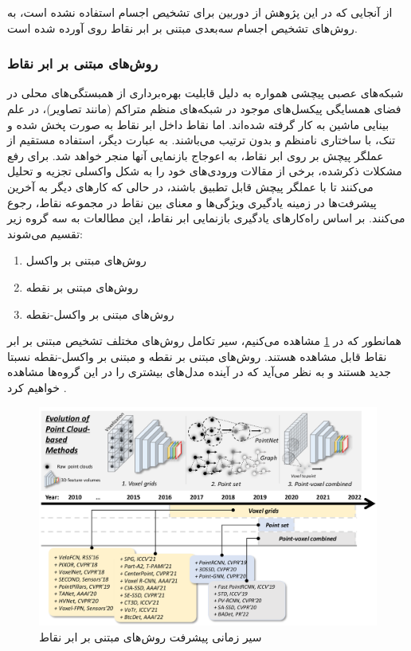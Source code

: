 از آنجایی که در این پژوهش از دوربین برای تشخیص اجسام استفاده نشده است، به روش‌های تشخیص اجسام سه‌بعدی مبتنی بر ابر نقاط روی آورده شده است.

\subsubsection{روش‌های مبتنی بر ابر نقاط}

شبکه‌های عصبی پیچشی همواره به دلیل قابلیت بهره‌برداری از همبستگی‌های  محلی در فضای همسایگی پیکسل‌های موجود در شبکه‌های منظم متراکم (مانند تصاویر)، در علم بینایی ماشین به کار گرفته‌ شده‌اند. اما نقاط داخل ابر نقاط به صورت پخش شده و تنک، با ساختاری نامنظم و بدون ترتیب می‌باشند. به عبارت دیگر، استفاده مستقیم از عملگر پیچش بر روی ابر نقاط، به اعوجاج بازنمایی آنها منجر خواهد شد. برای رفع مشکلات ذکرشده، برخی از مقالات ورودی‌های خود را به شکل واکسلی تجزیه و تحلیل می‌کنند تا با عملگر پیچش قابل تطبیق باشند، در حالی که کارهای دیگر به آخرین پیشرفت‌ها در زمینه یادگیری ویژگی‌ها و معنای بین نقاط در مجموعه نقاط، رجوع می‌کنند. بر اساس راه‌کارهای یادگیری بازنمایی ابر نقاط، این مطالعات به سه گروه زیر تقسیم می‌شوند:
\begin{enumerate}
    \item روش‌های مبتنی بر واکسل 
    \item روش‌های مبتنی بر نقطه 
    \item روش‌های مبتنی بر واکسل-نقطه
\end{enumerate}

همانطور که در \cref{fig:evolution_point_cloude_based} مشاهده می‌کنیم، سیر تکامل روش‌های مختلف تشخیص مبتنی بر ابر نقاط قابل مشاهده هستند. روش‌های مبتنی بر نقطه و مبتنی بر واکسل-نقطه نسبتا جدید هستند و به نظر می‌آید که در آینده مدل‌های بیشتری را در این گروه‌ها مشاهده خواهیم کرد \cite{qian20223d}.

\begin{figure}[h]
    \centering
    \includegraphics[width=1\linewidth]{figures/evolution_point_cloud_based.png}
    \caption{سیر زمانی پیشرفت روش‌های مبتنی بر ابر نقاط \cite{qian20223d}}
    \label{fig:evolution_point_cloude_based}
\end{figure}


